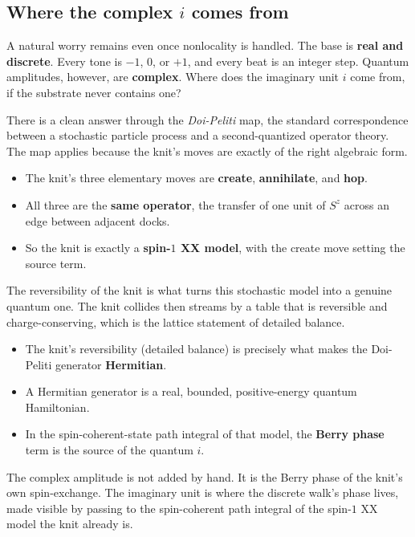 \subsection{Where the complex \texorpdfstring{$i$}{i} comes from}

A natural worry remains even once nonlocality is handled. The base is \textbf{real and discrete}. Every tone is $-1$, $0$, or $+1$, and every beat is an integer step. Quantum amplitudes, however, are \textbf{complex}. Where does the imaginary unit $i$ come from, if the substrate never contains one?

There is a clean answer through the \emph{Doi-Peliti} map, the standard correspondence between a stochastic particle process and a second-quantized operator theory. The map applies because the knit's moves are exactly of the right algebraic form.

\begin{itemize}
\item The knit's three elementary moves are \textbf{create}, \textbf{annihilate}, and \textbf{hop}.
\item All three are the \textbf{same operator}, the transfer of one unit of $S^z$ across an edge between adjacent docks.
\item So the knit is exactly a \textbf{spin-$1$ XX model}, with the create move setting the source term.
\end{itemize}

The reversibility of the knit is what turns this stochastic model into a genuine quantum one. The knit collides then streams by a table that is reversible and charge-conserving, which is the lattice statement of detailed balance.

\begin{itemize}
\item The knit's reversibility (detailed balance) is precisely what makes the Doi-Peliti generator \textbf{Hermitian}.
\item A Hermitian generator is a real, bounded, positive-energy quantum Hamiltonian.
\item In the spin-coherent-state path integral of that model, the \textbf{Berry phase} term is the source of the quantum $i$.
\end{itemize}

\begin{result}
The complex amplitude is not added by hand. It is the Berry phase of the knit's own spin-exchange. The imaginary unit is where the discrete walk's phase lives, made visible by passing to the spin-coherent path integral of the spin-$1$ XX model the knit already is.
\end{result}

